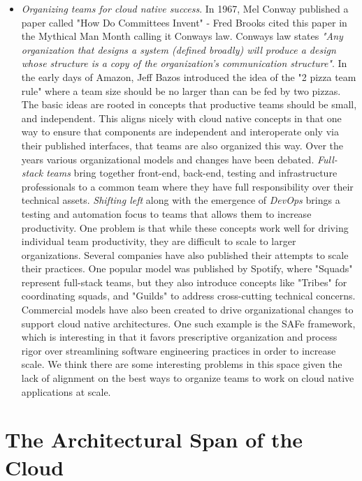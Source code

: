 \documentclass[conference]{IEEEconf}
\begin{document}
\begin{itemize}
	\item \textit{Organizing teams for cloud native success}.  In 1967, Mel Conway published a paper called "How Do Committees Invent" - Fred Brooks cited this paper in the Mythical Man Month\cite{Brooks1975} calling it Conways law\cite{ConwaysLaw}. Conways law states \textit{"Any organization that designs a system (defined broadly) will produce a design whose structure is a copy of the organization's communication structure"}.  In the early days of Amazon, Jeff Bazos introduced the idea of the "2 pizza team rule"\cite{TwoPizza} where a team size should be no larger than can be fed by two pizzas.  The basic ideas are rooted in concepts that productive teams should be small, and independent.  This aligns nicely with cloud native concepts in that one way to ensure that components are independent and interoperate only via their published interfaces, that teams are also organized this way.  Over the years various organizational models and changes have been debated. \textit{Full-stack teams} bring together front-end, back-end, testing and infrastructure professionals to a common team where they have full responsibility over their technical assets. \textit{Shifting left} along with the emergence of \textit{DevOps} brings a testing and automation focus to teams that allows them to increase productivity.  One problem is that while these concepts work well for driving individual team productivity, they are difficult to scale to larger organizations.  Several companies have also published their attempts to scale their practices.  One popular model was published by Spotify\cite{SpotifyModel}, where "Squads" represent full-stack teams, but they also introduce concepts like "Tribes" for coordinating squads, and "Guilds" to address cross-cutting technical concerns. Commercial models have also been created to drive organizational changes to support cloud native architectures.  One such example is the SAFe\cite{SAFeAgile} framework, which is interesting in that it favors prescriptive organization and process rigor over streamlining software engineering practices in order to increase scale. We think there are some interesting problems in this space given the lack of alignment on the best ways to organize teams to work on cloud native applications at scale. 
	        
\end{itemize} 


\section{The Architectural Span of the Cloud}
\label{sec:CloudArchitecture}
\end{document}
